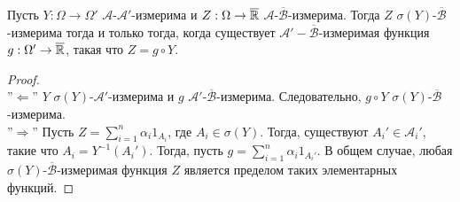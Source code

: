 \begin{thm}  \label{Factorization lemma}
	Пусть $Y:\Omega \rightarrow \Omega'$ $\mathcal{A}$-$\mathcal{A}'$-измерима и $Z: \Omega \rightarrow \overline{\mathbb{R}}$ $\mathcal{A}$-$\overline{\mathcal{B}}$-измерима. Тогда $Z$ $\sigma(Y)$-$\overline{\mathcal{B}}$-измерима тогда и только тогда, когда существует $\mathcal{A}'-\overline{\mathcal{B}}$-измеримая функция $g:\Omega' \rightarrow \overline{\mathbb{R}}$, такая что $Z = g \circ Y$.
\end{thm}
\begin{proof} \\
	
	''$\Longleftarrow$'' $Y$ $\sigma(Y)$-$\mathcal{A}'$-измерима и $g$ $\mathcal{A}'$-$\overline{\mathcal{B}}$-измерима. Следовательно, $g \circ Y$ $\sigma(Y)$-$\overline{\mathcal{B}}$-измерима. \\
	
	''$\Longrightarrow$'' Пусть $Z = \sum_{i=1}^n \alpha_i 1_{A_i}$, где $A_i \in \sigma(Y)$. Тогда, существуют $A_i' \in \mathcal{A}_i'$, такие что $A_i = Y^{-1}(A_i')$. Тогда, пусть $g = \sum_{i=1}^n \alpha_i 1_{A_i'}$. В общем случае, любая $\sigma(Y)$-$\overline{\mathcal{B}}$-измеримая функция $Z$ является пределом таких элементарных функций.
\end{proof}

